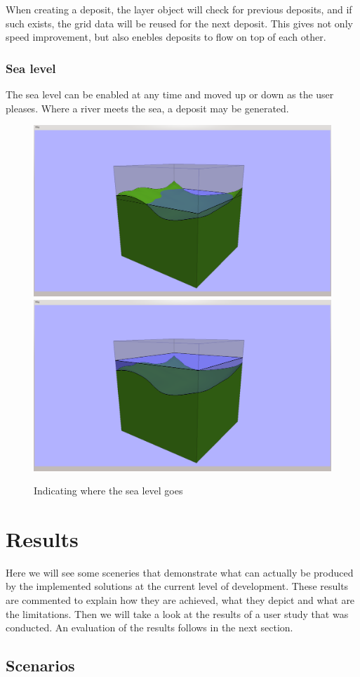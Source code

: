 \documentclass[a4paper,12pt]{report}
\begin{document}
When creating a deposit, the layer object will check for previous deposits, and if such exists, the grid data will be reused for the next deposit. This gives not only speed improvement, but also enebles deposits to flow on top of each other.

\subsection{Sea level}
The sea level can be enabled at any time and moved up or down as the user pleases. Where a river meets the sea, a deposit may be generated.

\begin{figure}
\includegraphics[trim = 90mm 7mm 80mm 30mm, clip,width=.5\linewidth]{thesis/results/seaEnabled.png}
\includegraphics[trim = 90mm 7mm 80mm 30mm, clip,width=.5\linewidth]{thesis/results/seaChanged.png}
 \caption{Indicating where the sea level goes}
 \label{fig:seaLevel}
\end{figure}


\clearpage
\chapter{Results}
Here we will see some sceneries that demonstrate what can actually be produced by the implemented solutions at the current level of development. These results are commented to explain how they are achieved, what they depict and what are the limitations. Then we will take a look at the results of a user study that was conducted. An evaluation of the results follows in the next section.
\label{sec:results}

\section{Scenarios}
\end{document}

